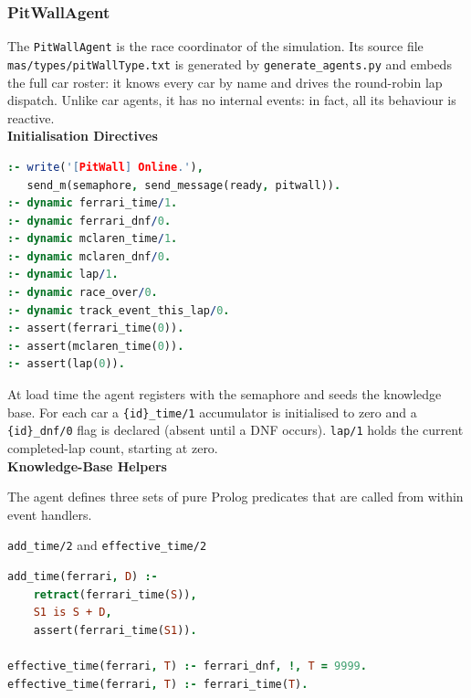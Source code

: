 \newpage
\subsubsection{PitWallAgent}

The \texttt{PitWallAgent} is the race coordinator of the simulation. Its source
file \texttt{mas/\allowbreak types/\allowbreak pitWallType.txt} is generated by \texttt{generate\_agents.py}
and embeds the full car roster: it knows every car by name and drives the
round-robin lap dispatch. Unlike car agents, it has no internal events: in fact, all its behaviour is reactive.\\

\textbf{Initialisation Directives}

\begin{minipage}{\linewidth}
\begin{lstlisting}[language=Prolog]
:- write('[PitWall] Online.'),
   send_m(semaphore, send_message(ready, pitwall)).
:- dynamic ferrari_time/1.
:- dynamic ferrari_dnf/0.
:- dynamic mclaren_time/1.
:- dynamic mclaren_dnf/0.
:- dynamic lap/1.
:- dynamic race_over/0.
:- dynamic track_event_this_lap/0.
:- assert(ferrari_time(0)).
:- assert(mclaren_time(0)).
:- assert(lap(0)).
\end{lstlisting}
\end{minipage}

\noindent
At load time the agent registers with the semaphore and seeds the knowledge
base. For each car a \texttt{\{id\}\_time/1} accumulator is initialised to
zero and a \texttt{\{id\}\_dnf/0} flag is declared (absent until a DNF
occurs). \texttt{lap/1} holds the current completed-lap count, starting at
zero.\\

\textbf{Knowledge-Base Helpers}

The agent defines three sets of pure Prolog predicates that are called from within event handlers. \\

\begin{minipage}{\linewidth}
\texttt{add\_time/2} and \texttt{effective\_time/2}

\begin{lstlisting}[language=Prolog]
add_time(ferrari, D) :-
    retract(ferrari_time(S)),
    S1 is S + D,
    assert(ferrari_time(S1)).

effective_time(ferrari, T) :- ferrari_dnf, !, T = 9999.
effective_time(ferrari, T) :- ferrari_time(T).
\end{lstlisting}
\end{minipage}

